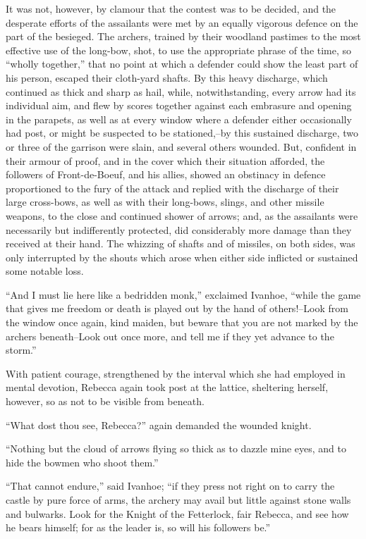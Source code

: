 It was not, however, by clamour that the contest was to be decided, and
the desperate efforts of the assailants were met by an equally vigorous
defence on the part of the besieged. The archers, trained by their
woodland pastimes to the most effective use of the long-bow, shot, to
use the appropriate phrase of the time, so ``wholly together,'' that no
point at which a defender could show the least part of his person,
escaped their cloth-yard shafts. By this heavy discharge, which
continued as thick and sharp as hail, while, notwithstanding, every
arrow had its individual aim, and flew by scores together against each
embrasure and opening in the parapets, as well as at every window where
a defender either occasionally had post, or might be suspected to be
stationed,--by this sustained discharge, two or three of the garrison
were slain, and several others wounded. But, confident in their armour
of proof, and in the cover which their situation afforded, the followers
of Front-de-Boeuf, and his allies, showed an obstinacy in defence
proportioned to the fury of the attack and replied with the discharge of
their large cross-bows, as well as with their long-bows, slings, and
other missile weapons, to the close and continued shower of arrows; and,
as the assailants were necessarily but indifferently protected, did
considerably more damage than they received at their hand. The whizzing
of shafts and of missiles, on both sides, was only interrupted by the
shouts which arose when either side inflicted or sustained some notable
loss.

``And I must lie here like a bedridden monk,'' exclaimed Ivanhoe,
``while the game that gives me freedom or death is played out by the
hand of others!--Look from the window once again, kind maiden, but
beware that you are not marked by the archers beneath--Look out once
more, and tell me if they yet advance to the storm.''

With patient courage, strengthened by the interval which she had
employed in mental devotion, Rebecca again took post at the lattice,
sheltering herself, however, so as not to be visible from beneath.

``What dost thou see, Rebecca?'' again demanded the wounded knight.

``Nothing but the cloud of arrows flying so thick as to dazzle mine
eyes, and to hide the bowmen who shoot them.''

``That cannot endure,'' said Ivanhoe; ``if they press not right on to
carry the castle by pure force of arms, the archery may avail but little
against stone walls and bulwarks. Look for the Knight of the Fetterlock,
fair Rebecca, and see how he bears himself; for as the leader is, so
will his followers be.''

